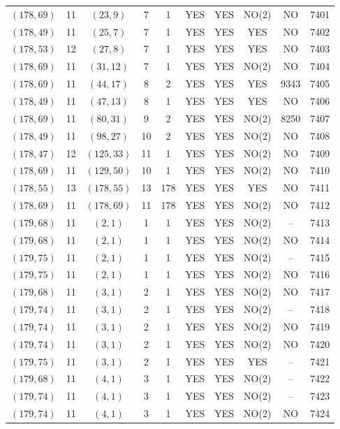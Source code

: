 \begin{longtable}{|c|c|c|c|c|c|c|c|c|c|}
$(178, 69)$ & 11 & $(23, 9)$ & 7 & 1 & YES & YES & NO(2) & NO & 7401\\
$(178, 49)$ & 11 & $(25, 7)$ & 7 & 1 & YES & YES & YES & NO & 7402\\
$(178, 53)$ & 12 & $(27, 8)$ & 7 & 1 & YES & YES & YES & NO & 7403\\
$(178, 69)$ & 11 & $(31, 12)$ & 7 & 1 & YES & YES & NO(2) & NO & 7404\\
$(178, 69)$ & 11 & $(44, 17)$ & 8 & 2 & YES & YES & YES & 9343 & 7405\\
$(178, 49)$ & 11 & $(47, 13)$ & 8 & 1 & YES & YES & YES & NO & 7406\\
$(178, 69)$ & 11 & $(80, 31)$ & 9 & 2 & YES & YES & NO(2) & 8250 & 7407\\
$(178, 49)$ & 11 & $(98, 27)$ & 10 & 2 & YES & YES & NO(2) & NO & 7408\\
$(178, 47)$ & 12 & $(125, 33)$ & 11 & 1 & YES & YES & NO(2) & NO & 7409\\
$(178, 69)$ & 11 & $(129, 50)$ & 10 & 1 & YES & YES & NO(2) & NO & 7410\\
$(178, 55)$ & 13 & $(178, 55)$ & 13 & 178 & YES & YES & YES & NO & 7411\\
$(178, 69)$ & 11 & $(178, 69)$ & 11 & 178 & YES & YES & NO(2) & NO & 7412\\
$(179, 68)$ & 11 & $(2, 1)$ & 1 & 1 & YES & YES & NO(2) & -- & 7413\\
$(179, 68)$ & 11 & $(2, 1)$ & 1 & 1 & YES & YES & NO(2) & NO & 7414\\
$(179, 75)$ & 11 & $(2, 1)$ & 1 & 1 & YES & YES & NO(2) & -- & 7415\\
$(179, 75)$ & 11 & $(2, 1)$ & 1 & 1 & YES & YES & NO(2) & NO & 7416\\
$(179, 68)$ & 11 & $(3, 1)$ & 2 & 1 & YES & YES & NO(2) & NO & 7417\\
$(179, 74)$ & 11 & $(3, 1)$ & 2 & 1 & YES & YES & NO(2) & -- & 7418\\
$(179, 74)$ & 11 & $(3, 1)$ & 2 & 1 & YES & YES & NO(2) & NO & 7419\\
$(179, 74)$ & 11 & $(3, 1)$ & 2 & 1 & YES & YES & NO(2) & NO & 7420\\
$(179, 75)$ & 11 & $(3, 1)$ & 2 & 1 & YES & YES & YES & -- & 7421\\
$(179, 68)$ & 11 & $(4, 1)$ & 3 & 1 & YES & YES & NO(2) & -- & 7422\\
$(179, 74)$ & 11 & $(4, 1)$ & 3 & 1 & YES & YES & NO(2) & -- & 7423\\
$(179, 74)$ & 11 & $(4, 1)$ & 3 & 1 & YES & YES & NO(2) & NO & 7424\\

\end{longtable}
